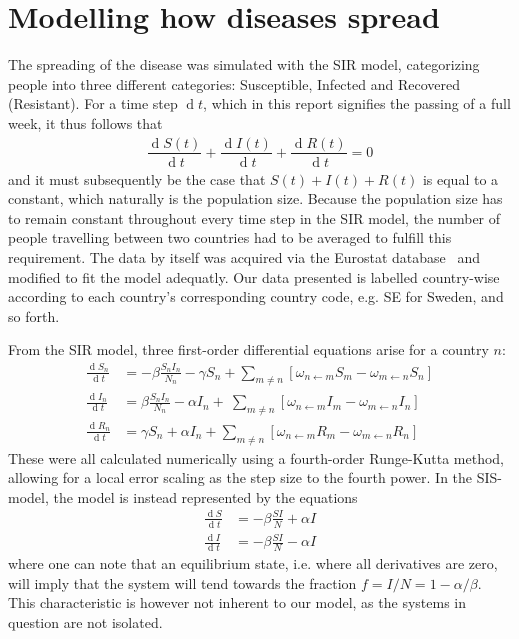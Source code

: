 \documentclass[a4paper,12pt]{article}
\renewcommand{\d}[1]{\ensuremath{\operatorname{d}\!{#1}}} %
\theoremstyle{plain}
\theoremstyle{definition}
\begin{document}
\section*{Modelling how diseases spread}
	\setcounter{equation}{0}
   The spreading of the disease was simulated with the SIR model, categorizing
   people into three different categories: Susceptible, Infected and Recovered
   (Resistant). For a time step $\d t$, which in this report signifies the
   passing of a full week, it thus follows that 
   \begin{align}
      \dfrac{\d S(t)}{\d t} + \dfrac{\d I(t)}{\d t} +
      \dfrac{\d R(t)}{\d t} = 0 
      \label{eq:SIR}
   \end{align}
   and it must subsequently be the case that $S(t) + I(t) + R(t)$ is equal to a
   constant, which naturally is the population size. Because the population size
   has to remain constant throughout every time step in the SIR model, the 
   number of people travelling between two countries had to be averaged to 
   fulfill this requirement. The data by itself was acquired via the
   Eurostat database~\cite{eurostat} and modified to fit the model adequatly.
   Our data presented is labelled country-wise according to each country's
   corresponding country code, e.g. SE for Sweden, and so forth.     

   From the SIR model, three first-order differential equations arise for a
   country $n$:
   \begin{align}
      \frac{\d S_n}{\d t} &= -\beta\frac{S_nI_n}{N_n} - \gamma S_n +
         \sum_{m \neq n} \left[ \omega_{n \leftarrow m }S_m - \omega_{m
         \leftarrow n}S_n \right ]  \\
      \frac{\d I_n}{\d t} &= \beta\frac{S_nI_n}{N_n} - \alpha I_n  + \
         \sum_{m \neq n} \left[ \omega_{n \leftarrow m }I_m - \omega_{m
         \leftarrow n}I_n \right ] \\
      \frac{\d R_n}{\d t} &= \gamma S_n + \alpha I_n + 
         \sum_{m \neq n} \left[ \omega_{n \leftarrow m }R_m - \omega_{m
         \leftarrow n}R_n \right ] 
      \label{eq:sireqs}
   \end{align}
   These were all calculated numerically using a fourth-order Runge-Kutta
   method, allowing for a local error scaling as the step size to the fourth
   power. In the SIS-model, the model is instead represented by the equations 
   \begin{align*}
      \frac{\d S}{\d t} &= -\beta\frac{SI}{N} + \alpha I \\
      \frac{\d I}{\d t} &= -\beta\frac{SI}{N} - \alpha I
   \end{align*}
   where one can note that an equilibrium state, i.e. where all derivatives are
   zero, will imply that the system will tend towards the fraction $f = I/N = 1 - \alpha /
   \beta$. This characteristic is however not inherent to our model, as the
   systems in question are not isolated. 
   
\end{document}
